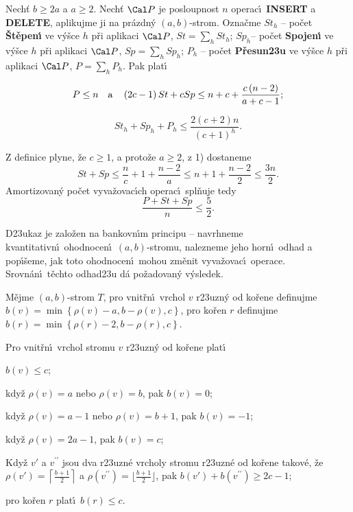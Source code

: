 Nech\v t $b\ge 2a$ a $a\ge 2$. Nech\v t $\Cal P$ je 
posloupnost $n$ operac\'\i\ {\bf INSERT} a {\bf DELETE}, aplikujme ji na 
pr\'azdn\'y $\left(a,b\right)$-strom. Ozna\v cme\newline 
$St_h$ -- po\v cet {\bf \v St\v epen\'\i} ve v\'y\v sce $h$ p\v ri aplikaci $
\Cal P$, $St=\sum_hSt_h$;\newline 
$Sp_h$-- po\v cet {\bf Spojen\'\i} ve v\'y\v sce $h$ p\v ri aplikaci $
\Cal P$, 
$Sp=\sum_hSp_h$;\newline 
$P_h$ -- po\v cet {\bf P\v resun\accent23u} ve v\'y\v sce $h$ p\v ri aplikaci $
\Cal P$, 
$P=\sum_hP_h$.\newline 
Pak plat\'\i
\roster
\item
$$P\le n\quad \text{\rm a}\quad \left(2c-1\right)St+cSp\le n+c+\frac {c\left(n-2\right)}{a+c-1};$$
\item
$$St_h+Sp_h+P_h\le\frac {2\left(c+2\right)n}{\left(c+1\right)^h}.$$
\endroster
\endproclaim


\flushpar Z definice plyne, \v ze $c\ge 1$, a proto\v ze $a\ge 2$, z 1) dostaneme
$$St+Sp\le\frac nc+1+\frac {n-2}a\le n+1+\frac {n-2}2\le\frac {3n}
2.$$
Amortizovan\'y po\v cet vyva\v zovac\'\i ch operac\'\i\ spl\v nuje tedy 
$$\frac {P+St+Sp}n\le\frac 52.$$
\medskip

\flushpar D\accent23ukaz je zalo\v zen na bankovn\'\i m principu -- 
navrhneme kvantitativn\'\i\ ohodnocen\'\i\ $\left(a,b\right)$-stromu, 
nalezneme jeho horn\'\i\ odhad a pop\'\i\v seme, jak 
toto ohodnocen\'\i\ mohou zm\v enit vyva\v zo\-vac\'\i\ ope\-race. Srovn\'an\'\i\ 
t\v echto odhad\accent23u d\'a po\v zadovan\'y v\'ysledek.
\medskip

\flushpar M\v ejme $\left(a,b\right)$-strom $T$, pro vnit\v rn\'\i\ vrchol 
$v$ r\accent23uzn\'y od ko\v rene definuj\-me 
$b\left(v\right)=\min\left\{\rho \left(v\right)-a,b-\rho \left(v\right),c\right\}$, pro 
ko\v ren $r$ definuj\-me $b\left(r\right)=\min\left\{\rho \left(r\right)-2,b-\rho \left(r\right),c\right\}$. 
\medskip

Pro vnit\v rn\'\i\ vrchol stromu $v$  
r\accent23uzn\'y od ko\v rene plat\'\i
\roster
\item
$b\left(v\right)\le c$;
\item
kdy\v z $\rho \left(v\right)=a$ nebo $\rho \left(v\right)=b$, pak $b\left(v\right)=0$;
\item
kdy\v z $\rho \left(v\right)=a-1$ nebo $\rho \left(v\right)=b+1$, pak $b\left(v\right)=-1$;
\item
kdy\v z $\rho \left(v\right)=2a-1$, pak $b\left(v\right)=c$;
\item
Kdy\v z $v'$ a $v^{\prime\prime}$ jsou dva r\accent23uzn\'e vrcholy stromu 
r\accent23uzn\'e od ko\v rene takov\'e, \v ze $\rho \left(v'\right)=\left\lceil\frac {
b+1}2\right\rceil$ a 
$\rho \left(v^{\prime\prime}\right)=\lfloor\frac {b+1}2\rfloor$, pak $b\left(v'\right)+
b\left(v^{\prime\prime}\right)\ge 2c-1$;
\item
pro ko\v ren $r$ plat\'\i\ $b\left(r\right)\le c$.
\endroster
\endproclaim

